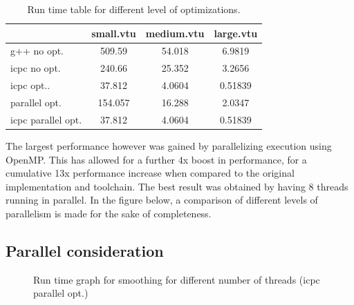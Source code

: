 \documentclass[fleqn,11pt]{SelfArx} %
\theoremstyle{definition}
\begin{document}
\begin{table}[!h]
\centering
\begin{tabular}{l|c|c|c}
 & small.vtu & medium.vtu & large.vtu \\  \hline
g++ no opt. & 509.59 & 54.018 & 6.9819 \\
icpc no opt. & 240.66 & 25.352 & 3.2656 \\
icpc opt.. & 37.812 & 4.0604 & 0.51839 \\
parallel opt. & 154.057 & 16.288 & 2.0347 \\
icpc parallel opt. & 37.812 & 4.0604 & 0.51839 \\
\end{tabular}
\caption{Run time table for different level of optimizations.}
\end{table}

The largest performance however was gained by parallelizing execution using OpenMP. This has allowed for a further 4x boost in performance, for a cumulative 13x performance increase when compared to the original implementation and toolchain. The best result was obtained by having 8 threads running in parallel. In the figure below, a comparison of different levels of parallelism is made for the sake of completeness.


\FloatBarrier
\subsection{Parallel consideration}
\begin{figure}[!h]
    \center
    \caption{Run time graph for smoothing for different number of threads (icpc parallel opt.)}
    \label{graph:timeMPI}
\end{figure}
\end{document}
